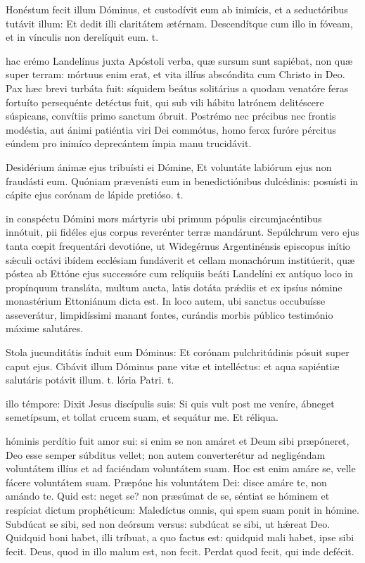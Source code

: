 \documentclass[fontsize=9pt,paper=A6,twoside,BCOR=1mm,DIV=22,headinclude]{scrarticle}
\begin{document}
\begin{multicols}{2}
\R Honéstum fecit illum Dóminus, et custodívit eum ab inimícis, et a seductóribus tutávit illum: \red{*} Et dedit illi claritátem ætérnam.
\V Descendítque cum illo in fóveam, et in vínculis non derelíquit eum. t.

 hac erémo Landelínus juxta Apóstoli verba, quæ sursum sunt sapiébat, non quæ super terram: mórtuus enim erat, et vita illíus abscóndita cum Christo in Deo. Pax hæc brevi turbáta fuit: síquidem beátus solitárius a quodam venatóre feras fortuíto persequénte detéctus fuit, qui sub vili hábitu latrónem delitéscere súspicans, convítiis primo sanctum óbruit. Postrémo nec précibus nec frontis modéstia, aut ánimi patiéntia viri Dei commótus, homo ferox furóre pércitus eúndem pro inimíco deprecántem ímpia manu trucidávit.

\R Desidérium ánimæ ejus tribuísti ei Dómine, \red{*} Et voluntáte labiórum ejus non fraudásti eum.
\V Quóniam prævenísti eum in benedictiónibus dulcédinis: posuísti in cápite ejus corónam de lápide pretióso. t.

 in conspéctu Dómini mors mártyris ubi primum pópulis circumjacéntibus innótuit, pii fidéles ejus corpus reverénter terræ mandárunt. Sepúlchrum vero ejus tanta cœpit frequentári devotióne, ut Widegérnus Argentinénsis episcopus inítio s\'æculi octávi ibídem ecclésiam fundáverit et cellam monachórum institúerit, quæ póstea ab Ettóne ejus successóre cum relíquiis beáti Landelíni ex antíquo loco in propínquum transláta, multum aucta, latis dotáta pr\'ædiis et ex ipsíus nómine monastérium Ettoniánum dicta est. In loco autem, ubi sanctus occubuísse asseverátur, limpidíssimi manant fontes, curándis morbis público testimónio máxime salutáres.

\R Stola jucunditátis índuit eum Dóminus: \red{*} Et corónam pulchritúdinis pósuit super caput ejus.
\V Cibávit illum Dóminus pane vitæ et intelléctus: et aqua sapiéntiæ salutáris potávit illum. t. lória Patri. t.

 illo témpore: Dixit Jesus discípulis suis: Si quis vult post me veníre, ábneget semetípsum, et tollat crucem suam, et sequátur me. Et réliqua.

 hóminis perdítio fuit amor sui: si enim se non amáret et Deum sibi præpóneret, Deo esse semper súbditus vellet; non autem converterétur ad negligéndam voluntátem illíus et ad faciéndam voluntátem suam. Hoc est enim amáre se, velle fácere voluntátem suam. Præpóne his voluntátem Dei: disce amáre te, non amándo te. Quid est: neget se? non præsúmat de se, séntiat se hóminem et respíciat dictum prophéticum: Maledíctus omnis, qui spem suam ponit in hómine. Subdúcat se sibi, sed non deórsum versus: subdúcat se sibi, ut h\'æreat Deo. Quidquid boni habet, illi tríbuat, a quo factus est: quidquid mali habet, ipse sibi fecit. Deus, quod in illo malum est, non fecit. Perdat quod fecit, qui inde defécit.


\end{multicols}
\end{document}
